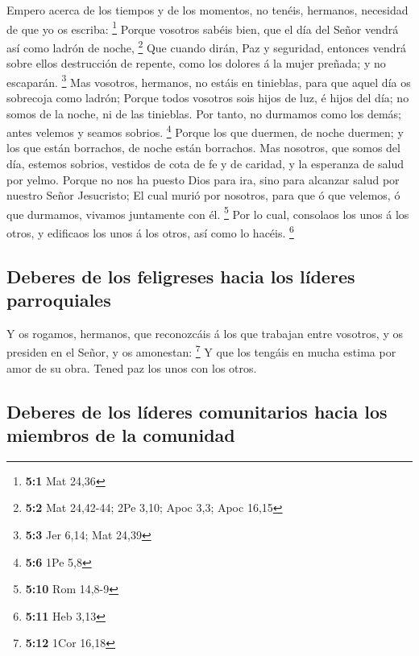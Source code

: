  Empero acerca de los tiempos y de los momentos, no
tenéis, hermanos, necesidad de que yo os escriba: \footnote{\textbf{5:1}
  Mat 24,36}  Porque vosotros sabéis bien, que el día del
Señor vendrá así como ladrón de noche, \footnote{\textbf{5:2} Mat
  24,42-44; 2Pe 3,10; Apoc 3,3; Apoc 16,15}  Que cuando
dirán, Paz y seguridad, entonces vendrá sobre ellos destrucción de
repente, como los dolores á la mujer preñada; y no escaparán.
\footnote{\textbf{5:3} Jer 6,14; Mat 24,39}  Mas vosotros,
hermanos, no estáis en tinieblas, para que aquel día os sobrecoja como
ladrón;  Porque todos vosotros sois hijos de luz, é hijos
del día; no somos de la noche, ni de las tinieblas.  Por
tanto, no durmamos como los demás; antes velemos y seamos sobrios.
\footnote{\textbf{5:6} 1Pe 5,8}  Porque los que duermen,
de noche duermen; y los que están borrachos, de noche están borrachos.
 Mas nosotros, que somos del día, estemos sobrios,
vestidos de cota de fe y de caridad, y la esperanza de salud por yelmo.
 Porque no nos ha puesto Dios para ira, sino para alcanzar
salud por nuestro Señor Jesucristo;  El cual murió por
nosotros, para que ó que velemos, ó que durmamos, vivamos juntamente con
él. \footnote{\textbf{5:10} Rom 14,8-9}  Por lo cual,
consolaos los unos á los otros, y edificaos los unos á los otros, así
como lo hacéis. \footnote{\textbf{5:11} Heb 3,13}

\hypertarget{deberes-de-los-feligreses-hacia-los-luxedderes-parroquiales}{%
\subsection{Deberes de los feligreses hacia los líderes
parroquiales}\label{deberes-de-los-feligreses-hacia-los-luxedderes-parroquiales}}

 Y os rogamos, hermanos, que reconozcáis á los que
trabajan entre vosotros, y os presiden en el Señor, y os amonestan:
\footnote{\textbf{5:12} 1Cor 16,18}  Y que los tengáis en
mucha estima por amor de su obra. Tened paz los unos con los otros.

\hypertarget{deberes-de-los-luxedderes-comunitarios-hacia-los-miembros-de-la-comunidad}{%
\subsection{Deberes de los líderes comunitarios hacia los miembros de la
comunidad}\label{deberes-de-los-luxedderes-comunitarios-hacia-los-miembros-de-la-comunidad}}


